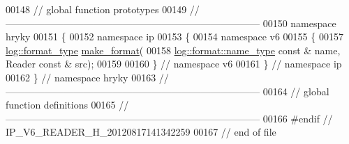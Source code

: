 \begin{DoxyCode}
00148 \textcolor{comment}{// global function prototypes}
00149 \textcolor{comment}{//
      ------------------------------------------------------------------------------}
00150 \textcolor{keyword}{namespace }hryky
00151 \{
00152 \textcolor{keyword}{namespace }ip
00153 \{
00154 \textcolor{keyword}{namespace }v6
00155 \{
00157     \hyperlink{namespacehryky_1_1log_ad50448c3f934f1eacd5c1bcffe8111e1}{log::format_type} \hyperlink{namespacehryky_afd615217f648ff164bc40fb82166d959}{make_format}(
00158         \hyperlink{namespacehryky_1_1log_1_1format_ab7408d1e2ed2d648dbf9bba69eb74288}{log::format::name_type} \textcolor{keyword}{const} & name, Reader \textcolor{keyword}{const} & src);
00159 
00160 \} \textcolor{comment}{// namespace v6}
00161 \} \textcolor{comment}{// namespace ip}
00162 \} \textcolor{comment}{// namespace hryky}
00163 \textcolor{comment}{//
      ------------------------------------------------------------------------------}
00164 \textcolor{comment}{// global function definitions}
00165 \textcolor{comment}{//
      ------------------------------------------------------------------------------}
00166 \textcolor{preprocessor}{#endif // IP\_V6\_READER\_H\_20120817141342259}
00167 \textcolor{preprocessor}{}\textcolor{comment}{// end of file}
\end{DoxyCode}
